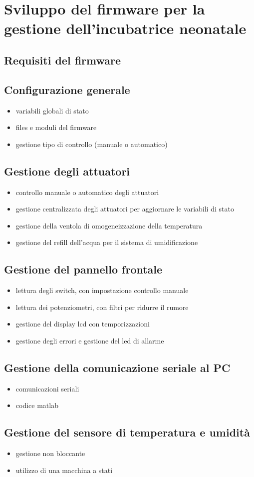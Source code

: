\chapter{Sviluppo del firmware per la gestione dell'incubatrice neonatale}
\section{Requisiti del firmware}

\section{Configurazione generale}
\begin{itemize}
	\item variabili globali di stato
	\item files e moduli del firmware
	\item gestione tipo di controllo (manuale o automatico)
\end{itemize}

\section{Gestione degli attuatori}
\begin{itemize}
	\item controllo manuale o automatico degli attuatori
	\item gestione centralizzata degli attuatori per aggiornare le variabili di stato
	\item gestione della ventola di omogeneizzazione della temperatura
	\item gestione del refill dell'acqua per il sistema di umidificazione
\end{itemize}

\section{Gestione del pannello frontale}
\begin{itemize}
	\item lettura degli switch, con impostazione controllo manuale
	\item lettura dei potenziometri, con filtri per ridurre il rumore
	\item gestione del display lcd con temporizzazioni
	\item gestione degli errori e gestione del led di allarme
\end{itemize}


\section{Gestione della comunicazione seriale al PC}
\begin{itemize}
	\item comunicazioni seriali
	\item codice matlab
\end{itemize}

\section{Gestione del sensore di temperatura e umidità}
\begin{itemize}
	\item gestione non bloccante
	\item utilizzo di una macchina a stati
\end{itemize}
